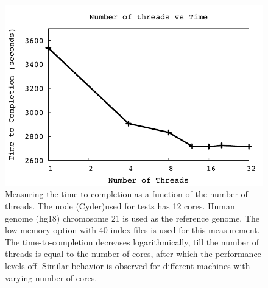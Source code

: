 \documentclass{acm_proc_article-sp}
\begin{document}
%
%


 \begin{figure}
 \centering
\includegraphics[scale=0.66]{figures/threadsvstime.pdf} 

\caption{\small Measuring the time-to-completion as a function of the
  number of threads.  The node (Cyder)used for tests has 12 cores.  Human
  genome (hg18) chromosome 21 is used as the reference genome. The low
  memory option with 40 index files is used for this measurement. The
  time-to-completion decreases logarithmically, till the number of
  threads is equal to the number of cores, after which the performance
  levels off. Similar behavior is observed for different machines
  with varying number of cores.}
  \label{fig:threading-benchmark} 
 \end{figure}
\end{document}
